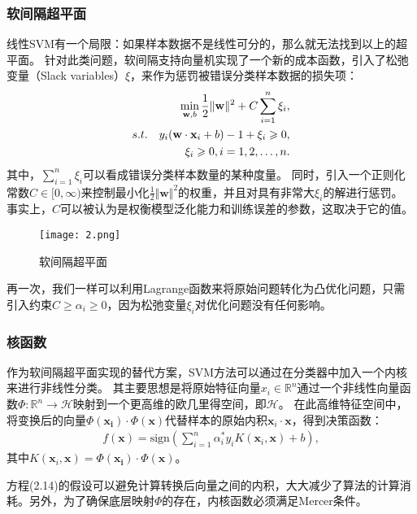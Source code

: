 \subsubsection{软间隔超平面}

线性SVM有一个局限：如果样本数据不是线性可分的，那么就无法找到以上的超平面。
针对此类问题，软间隔支持向量机实现了一个新的成本函数，引入了松弛变量（Slack variables）$\xi$，来作为惩罚被错误分类样本数据的损失项：
\begin{align}
    \min_{\mathbf{w},b}\frac{1}{2}\Vert\mathbf{w}\Vert^2+C\sum_{i=1}^n\xi_i,\\
    s.t.\quad y_i(\mathbf{w}\cdot\mathbf{x}_i+b)-1+\xi_i\geq0,\notag\\
    \xi_i\geq0,i=1,2,\ldots,n.\notag
\end{align}
其中，$\sum_{i=1}^n\xi_i$可以看成错误分类样本数量的某种度量。
同时，引入一个正则化常数$C\in[0,\infty)$来控制最小化$\frac{1}{2}\Vert\mathbf{w}\Vert^2$的权重，并且对具有非常大$\xi_i$的解进行惩罚。
事实上，$C$可以被认为是权衡模型泛化能力和训练误差的参数，这取决于它的值。

\begin{figure}[ht]
    \centering
    \texttt{[image: 2.png]}
    \caption{软间隔超平面}
\end{figure}

再一次，我们一样可以利用Lagrange函数来将原始问题转化为凸优化问题，只需引入约束$C\geq\alpha_i\geq0$，因为松弛变量$\xi_i$对优化问题没有任何影响。

\subsubsection{核函数}

作为软间隔超平面实现的替代方案，SVM方法可以通过在分类器中加入一个内核来进行非线性分类。
其主要思想是将原始特征向量$x_i\in\mathbb{R}^n$通过一个非线性向量函数$\Phi: \mathbb{R}^n\to\mathcal{H}$映射到一个更高维的欧几里得空间，即$\mathcal{H}$。
在此高维特征空间中，将变换后的向量$\Phi(\mathbf{x_i})\cdot\Phi(\mathbf{x})$代替样本的原始内积$\mathbf{x}_i\cdot\mathbf{x}$，得到决策函数：
\begin{align}
    f(\mathbf{x})=\mathrm{sign}(\sum_{i=1}^n\alpha_i^*y_iK(\mathbf{x}_i,\mathbf{x})+b),
\end{align}
其中$K(\mathbf{x}_i,\mathbf{x})=\Phi(\mathbf{x_i})\cdot\Phi(\mathbf{x})$。

方程(2.14)的假设可以避免计算转换后向量之间的内积，大大减少了算法的计算消耗。另外，为了确保底层映射$\Phi$的存在，内核函数必须满足Mercer条件\cite{en1}。

